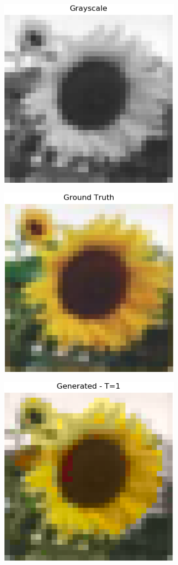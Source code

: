 \begin{figure}[H]
  \centering
  \vspace{1cm}
  \begin{subfigure}
    \centering
    \includegraphics[width=.24\textwidth]{resources/experiments/cifar/200_grayscale.png}
  \end{subfigure}
  \begin{subfigure}
    \centering
    \includegraphics[width=.24\textwidth]{resources/experiments/cifar/200_original.png}
  \end{subfigure}
  \begin{subfigure}
    \centering
    \includegraphics[width=.24\textwidth]{resources/experiments/cifar/200_t1.png}
  \end{subfigure}


\end{figure}

